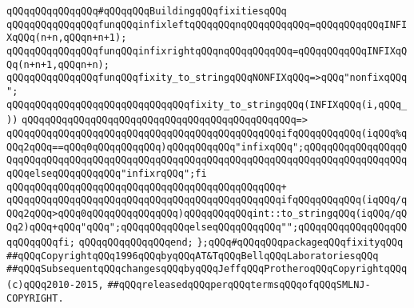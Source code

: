 \newline
\verb|qQQqqQQqqQQqqQQq#qQQqqQQqBuildingqQQqfixitiesqQQq|\newline
\newline
\verb|qQQqqQQqqQQqqQQqfunqQQqinfixleftqQQqqQQqnqQQqqQQqqQQq=qQQqqQQqqQQqINFIXqQQq(n+n,qQQqn+n+1);|\newline
\verb|qQQqqQQqqQQqqQQqfunqQQqinfixrightqQQqnqQQqqQQqqQQq=qQQqqQQqqQQqINFIXqQQq(n+n+1,qQQqn+n);|\newline
\newline
\verb|qQQqqQQqqQQqqQQqfunqQQqfixity_to_stringqQQqNONFIXqQQq=>qQQq"nonfixqQQq";|\newline
\newline
\verb|qQQqqQQqqQQqqQQqqQQqqQQqqQQqqQQqfixity_to_stringqQQq(INFIXqQQq(i,qQQq_))|\newline
\verb|qQQqqQQqqQQqqQQqqQQqqQQqqQQqqQQqqQQqqQQqqQQqqQQq=>|\newline
\verb|qQQqqQQqqQQqqQQqqQQqqQQqqQQqqQQqqQQqqQQqqQQqqQQqifqQQqqQQqqQQq(iqQQq%qQQq2qQQq==qQQq0qQQqqQQqqQQq)qQQqqQQqqQQq"infixqQQq";qQQqqQQqqQQqqQQqqQQqqQQqqQQqqQQqqQQqqQQqqQQqqQQqqQQqqQQqqQQqqQQqqQQqqQQqqQQqqQQqqQQqqQQqqQQqelseqQQqqQQqqQQq"infixrqQQq";fi|\newline
\verb|qQQqqQQqqQQqqQQqqQQqqQQqqQQqqQQqqQQqqQQqqQQqqQQq+|\newline
\verb|qQQqqQQqqQQqqQQqqQQqqQQqqQQqqQQqqQQqqQQqqQQqqQQqifqQQqqQQqqQQq(iqQQq/qQQq2qQQq>qQQq0qQQqqQQqqQQqqQQq)qQQqqQQqqQQqint::to_stringqQQq(iqQQq/qQQq2)qQQq+qQQq"qQQq";qQQqqQQqqQQqelseqQQqqQQqqQQq"";qQQqqQQqqQQqqQQqqQQqqQQqqQQqfi;|\newline
\verb|qQQqqQQqqQQqqQQqend;|\newline
\newline
\verb|};qQQq#qQQqqQQqpackageqQQqfixityqQQq|\newline
\newline
\newline
\newline
\verb|##qQQqCopyrightqQQq1996qQQqbyqQQqAT&TqQQqBellqQQqLaboratoriesqQQq|\newline
\verb|##qQQqSubsequentqQQqchangesqQQqbyqQQqJeffqQQqProtheroqQQqCopyrightqQQq(c)qQQq2010-2015,|\newline
\verb|##qQQqreleasedqQQqperqQQqtermsqQQqofqQQqSMLNJ-COPYRIGHT.|\newline

